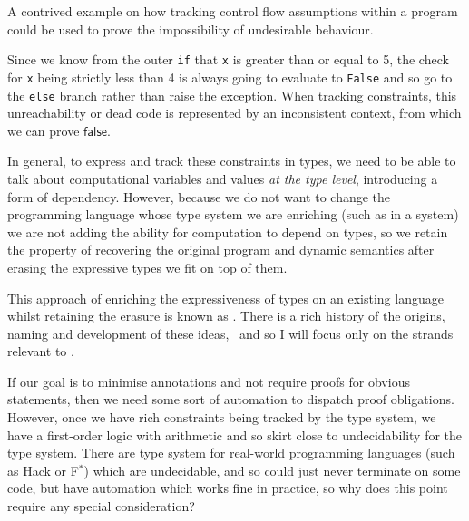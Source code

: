 \begin{marginfigure}
    \inputminted[breaklines,mathescape,fontsize=\small]{py}{code/dead_code.py}
    \caption{A contrived example on how tracking control flow assumptions
        within a program could be used to prove the impossibility of
        undesirable behaviour.}\label{fig:dead-code}
\end{marginfigure}

Since we know from the outer \texttt{if} that \texttt{x} is
greater than or equal to 5, the check for \texttt{x} being strictly
less than 4 is always going to evaluate to \texttt{False} and so go to
the \texttt{else} branch rather than raise the exception. When tracking
constraints, this unreachability or dead code is represented by an inconsistent
context, from which we can prove $\mathsf{false}$.

In general, to express and track these constraints in types, we need to be able
to talk about computational variables and values \emph{at the type level},
introducing a form of dependency. However, because we do not want to change the
programming language whose type system we are enriching (such as in a
 system) we are not adding the ability for computation to
depend on types, so we retain the property of recovering the original program
and dynamic semantics after erasing the expressive types we fit on top of them.

This approach of enriching the expressiveness of types on an existing language
whilst retaining the erasure is known as . There is a
rich history of the origins, naming and development of these
ideas,~ and so I will focus only on the strands
relevant to .

If our goal is to minimise annotations and not require proofs for obvious
statements, then we need some sort of automation to dispatch proof
obligations. However, once we have rich constraints being tracked by the type
system, we have a first-order logic with arithmetic and so skirt close to
undecidability for the type system. There are type system for real-world
programming languages (such as Hack or F$^*$) which are undecidable, and so
could just never terminate on some code, but have automation which works fine
in practice, so why does this point require any special consideration?

